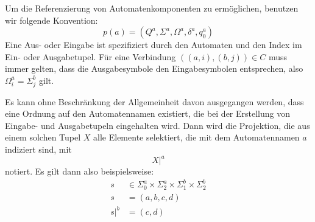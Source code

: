 Um die Referenzierung von Automatenkomponenten zu ermöglichen, benutzen wir folgende Konvention:
\[ p(a) = (Q^a,\Sigma^a,\Omega^a,\delta^a,q_0^a) \]
Eine Aus- oder Eingabe ist spezifiziert durch den Automaten und den Index im Ein- oder Ausgabetupel.
Für eine Verbindung $((a,i),(b,j))\in C$ muss immer gelten, dass die Ausgabesymbole den Eingabesymbolen entsprechen, also $\Omega_i^a = \Sigma_j^b$ gilt.

\begin{notation}
  Es kann ohne Beschränkung der Allgemeinheit davon ausgegangen werden, dass eine Ordnung auf den Automatennamen existiert, die bei der Erstellung von Eingabe- und Ausgabetupeln eingehalten wird.
  Dann wird die Projektion, die aus einem solchen Tupel $X$ alle Elemente selektiert, die mit dem Automatennamen $a$ indiziert sind, mit
  \[ X|^a \]
  notiert.
  Es gilt dann also beispielsweise:
  \begin{align*}
    s &\in \Sigma^a_0\times\Sigma^a_2\times\Sigma^b_1\times\Sigma^b_2\\
    s &= (a,b,c,d)\\
    s|^b &= (c,d)
  \end{align*}
\end{notation}

